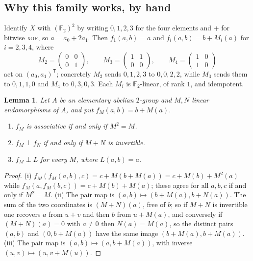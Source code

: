 \documentclass[11pt]{amsart}
\newtheorem{lemma}[theorem]{Lemma}
\theoremstyle{remark}
\theoremstyle{definition}
\newcommand{\FF}{\mathbb F}
\begin{document}
\subsection*{Why this family works, by hand}
Identify $X$ with $(\FF_2)^2$ by writing $0,1,2,3$ for the four elements and $+$ for bitwise
\textsc{xor}, so $a=a_0+2a_1$. Then $f_1(a,b)=a$ and $f_i(a,b)=b+M_i(a)$ for $i=2,3,4$, where
\[
M_2=\begin{pmatrix}0&0\\0&1\end{pmatrix},\qquad
M_3=\begin{pmatrix}1&1\\0&0\end{pmatrix},\qquad
M_4=\begin{pmatrix}1&0\\1&0\end{pmatrix}
\]
act on $(a_0,a_1)^{\mathsf T}$; concretely $M_2$ sends $0,1,2,3$ to $0,0,2,2$, while $M_3$ sends
them to $0,1,1,0$ and $M_4$ to $0,3,0,3$. Each $M_i$ is $\FF_2$-linear, of rank $1$, and
idempotent.

\begin{lemma}\label{lem:hand}
Let $A$ be an elementary abelian $2$-group and $M,N$ linear endomorphisms of $A$, and put
$f_M(a,b)=b+M(a)$.
\begin{enumerate}
\item[(i)] $f_M$ is associative if and only if $M^2=M$.
\item[(ii)] $f_M\perp f_N$ if and only if $M+N$ is invertible.
\item[(iii)] $f_M\perp L$ for every $M$, where $L(a,b)=a$.
\end{enumerate}
\end{lemma}

\begin{proof}
(i) $f_M(f_M(a,b),c)=c+M(b+M(a))=c+M(b)+M^2(a)$ while $f_M(a,f_M(b,c))=c+M(b)+M(a)$; these agree for
all $a,b,c$ if and only if $M^2=M$. (ii) The pair map is $(a,b)\mapsto(b+M(a),b+N(a))$. The sum of
the two coordinates is $(M+N)(a)$, free of $b$; so if $M+N$ is invertible one recovers $a$ from
$u+v$ and then $b$ from $u+M(a)$, and conversely if $(M+N)(a)=0$ with $a\ne0$ then $N(a)=M(a)$, so the
distinct pairs $(a,b)$ and $(0,b+M(a))$ have the same image $(b+M(a),b+M(a))$. (iii) The pair map
is $(a,b)\mapsto(a,b+M(a))$, with inverse $(u,v)\mapsto(u,v+M(u))$.
\end{proof}
\end{document}
